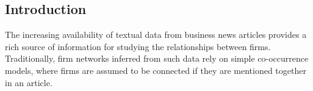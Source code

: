 %
%
%
%


\subsection{Introduction}

The increasing availability of textual data from business news articles provides a rich source of information for studying the relationships between firms. Traditionally, firm networks inferred from such data rely on simple co-occurrence models, where firms are assumed to be connected if they are mentioned together in an article. 


